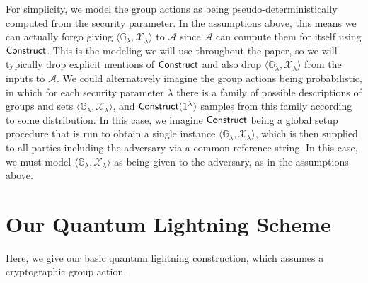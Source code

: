 \documentclass{article}\usepackage[a4paper,margin=20mm]{geometry}
\numberwithin{theorem}{section}
\numberwithin{equation}{section}
\newcommand{\G}{\mathbb{G}}
\newcommand{\As}{{\mathcal{A}}}
\newcommand{\Xs}{{\mathcal{X}}}
\begin{document}
\begin{remark}For simplicity, we model the group actions as being pseudo-deterministically computed from the security parameter. In the assumptions above, this means we can actually forgo giving $\langle\G_\lambda,\Xs_\lambda\rangle$ to $\As$ since $\As$ can compute them for itself using ${\sf Construct}$. This is the modeling we will use throughout the paper, so we will typically drop explicit mentions of ${\sf Construct}$ and also drop $\langle\G_\lambda,\Xs_\lambda\rangle$ from the inputs to $\As$. We could alternatively imagine the group actions being probabilistic, in which for each security parameter $\lambda$ there is a family of possible descriptions of groups and sets $\langle\G_\lambda,\Xs_\lambda\rangle$, and ${\sf Construct}(1^\lambda)$ samples from this family according to some distribution. In this case, we imagine ${\sf Construct}$ being a global setup procedure that is run to obtain a single instance $\langle\G_\lambda,\Xs_\lambda\rangle$, which is then supplied to all parties including the adversary via a common reference string. In this case, we must model $\langle\G_\lambda,\Xs_\lambda\rangle$ as being given to the adversary, as in the assumptions above.
\end{remark}






\section{Our Quantum Lightning Scheme}\label{sec:constr}

Here, we give our basic quantum lightning construction, which assumes a cryptographic group action.
\end{document}
